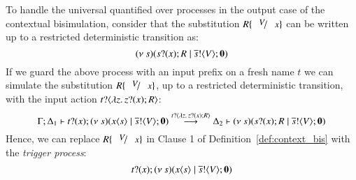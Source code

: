 To handle the universal quantified over processes in the output
case of the contextual bisimulation, consider that
the substitution $R \subst{V}{x}$ can be written up to 
a restricted deterministic transition as:
%
\[
	(\nu\ s)(s ? (x) ; R \;|\; \overline{s} ! \langle V \rangle ; \mathbf{0})
\]
%
If we guard the above process with an input prefix
on a fresh name $t$ we can simulate the 
substitution $R \subst{V}{x}$, up to a restricted
deterministic transition, with the input action
$t ? \langle \lambda z.\,z ? (x) ; R \rangle$:
%
\[
	\Gamma; \Delta_1 \vdash t ? (x) ; (\nu\ s)(x\langle s \rangle \;|\; \overline{s} ! \langle V \rangle ; \mathbf{0}) \stackrel{t ? \langle \lambda z.\,z ? (x) ; R \rangle}{\longrightarrow} \Delta_2 \vdash (\nu\ s)(s ? (x) ; R \;|\; \overline{s} ! \langle V \rangle ; \mathbf{0})
\]
%
Hence, we can replace $R \subst{V}{x}$ in Clause 1
of Definition~\ref{def:context_bis}
with the {\em trigger process}:
%
\[
	t ? (x) ; (\nu\ s)(x\langle s \rangle \;|\; \overline{s} ! \langle V \rangle ; \mathbf{0})
\]
%
%
%
%
%
%

